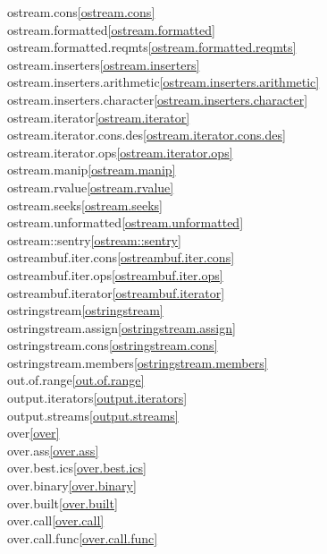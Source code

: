\begin{multicols}{2}
ostream.cons\quad\ref{ostream.cons}\\
ostream.formatted\quad\ref{ostream.formatted}\\
ostream.formatted.reqmts\quad\ref{ostream.formatted.reqmts}\\
ostream.inserters\quad\ref{ostream.inserters}\\
ostream.inserters.arithmetic\quad\ref{ostream.inserters.arithmetic}\\
ostream.inserters.character\quad\ref{ostream.inserters.character}\\
ostream.iterator\quad\ref{ostream.iterator}\\
ostream.iterator.cons.des\quad\ref{ostream.iterator.cons.des}\\
ostream.iterator.ops\quad\ref{ostream.iterator.ops}\\
ostream.manip\quad\ref{ostream.manip}\\
ostream.rvalue\quad\ref{ostream.rvalue}\\
ostream.seeks\quad\ref{ostream.seeks}\\
ostream.unformatted\quad\ref{ostream.unformatted}\\
ostream::sentry\quad\ref{ostream::sentry}\\
ostreambuf.iter.cons\quad\ref{ostreambuf.iter.cons}\\
ostreambuf.iter.ops\quad\ref{ostreambuf.iter.ops}\\
ostreambuf.iterator\quad\ref{ostreambuf.iterator}\\
ostringstream\quad\ref{ostringstream}\\
ostringstream.assign\quad\ref{ostringstream.assign}\\
ostringstream.cons\quad\ref{ostringstream.cons}\\
ostringstream.members\quad\ref{ostringstream.members}\\
out.of.range\quad\ref{out.of.range}\\
output.iterators\quad\ref{output.iterators}\\
output.streams\quad\ref{output.streams}\\
over\quad\ref{over}\\
over.ass\quad\ref{over.ass}\\
over.best.ics\quad\ref{over.best.ics}\\
over.binary\quad\ref{over.binary}\\
over.built\quad\ref{over.built}\\
over.call\quad\ref{over.call}\\
over.call.func\quad\ref{over.call.func}\\

\end{multicols}
